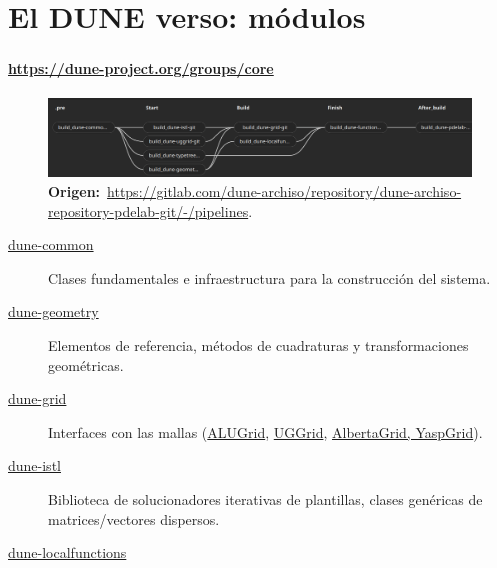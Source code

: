 \section{El DUNE verso: módulos}

\begin{frame}[fragile]
	\frametitle{\secname}
	\framesubtitle{\url{https://dune-project.org/groups/core}}

	\begin{figure}[ht!]
		\centering
		\includegraphics[width=14.6cm]{dependences}
		\caption*{
			\textbf{Origen:}~\url{https://gitlab.com/dune-archiso/repository/dune-archiso-repository-pdelab-git/-/pipelines}.
		}
	\end{figure}

	\begin{description}
		\item[\href{https://dune-project.org/modules/dune-common}{dune-common}]

			Clases fundamentales e infraestructura para la construcción del
			sistema.

		\item[\href{https://dune-project.org/modules/dune-geometry}{dune-geometry}]

			Elementos de referencia, métodos de cuadraturas y
			transformaciones geométricas.

		\item[\href{https://dune-project.org/modules/dune-grid}{dune-grid}]

			Interfaces con las mallas
			(\href{https://dune-project.org/modules/dune-alugrid}{ALUGrid},
			\href{https://dune-project.org/modules/dune-uggrid}{UGGrid},
			\href{https://dune-project.org/modules/dune-grid}{AlbertaGrid, YaspGrid}).

		\item[\href{https://dune-project.org/modules/dune-istl}{dune-istl}]

			Biblioteca de solucionadores iterativas de plantillas, clases
			genéricas de matrices/vectores dispersos.

		\item[\href{https://dune-project.org/modules/dune-localfunctions}{dune-localfunctions}]


\end{description}
\end{frame}
